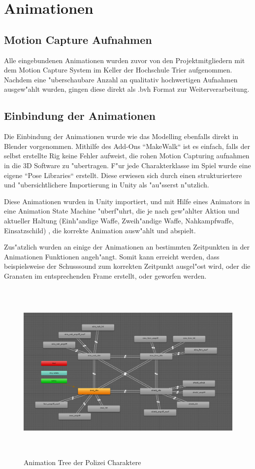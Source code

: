 \chapter{Animationen}

\section{Motion Capture Aufnahmen}
Alle eingebundenen Animationen wurden zuvor von den Projektmitgliedern mit dem Motion Capture System im Keller der Hochschule Trier aufgenommen. Nachdem eine "uberschaubare Anzahl an qualitativ hochwertigen Aufnahmen ausgew"ahlt wurden, gingen diese direkt als .bvh Format zur Weiterverarbeitung.

\section{Einbindung der Animationen}
Die Einbindung der Animationen wurde wie das Modelling ebenfalls direkt in Blender vorgenommen. Mithilfe des Add-Ons ``MakeWalk`` ist es einfach, falls der selbst erstellte Rig keine Fehler aufweist, die rohen Motion Capturing aufnahmen in die 3D Software zu "ubertragen. F"ur jede Charakterklasse im Spiel wurde eine eigene ``Pose Libraries`` erstellt. Diese erwiesen sich durch einen strukturiertere und "ubersichtlichere Importierung in Unity als "au"sserst n"utzlich.\newline

Diese Animationen wurden in Unity importiert, und mit Hilfe eines Animators in eine Animation State Machine "uberf"uhrt, die je nach gew"ahlter Aktion und aktueller Haltung (Einh"andige Waffe, Zweih"andige Waffe, Nahkampfwaffe, Einsatzschild) , die korrekte Animation ausw"ahlt und abspielt.

Zus"atzlich wurden an einige der Animationen an bestimmten Zeitpunkten in der Animationen Funktionen angeh"angt. Somit kann erreicht werden, dass beispielsweise der Schusssound zum korrekten Zeitpunkt ausgel"ost wird, oder die Granaten im entsprechenden Frame erstellt, oder geworfen werden.

\begin{figure}
	\centering
	\includegraphics[height=9cm]{images/animator_tree.png}
	\caption{Animation Tree der Polizei Charaktere}
	\label{fig:anim_tree_police}
\end{figure}